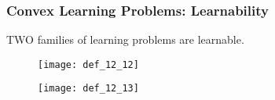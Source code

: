 \begin{frame}
\frametitle{Convex Learning Problems: Learnability}
TWO families of learning problems are learnable.

\begin{figure}
    \centering
    \texttt{[image: def\_12\_12]}
\end{figure}

\begin{figure}
    \centering
    \texttt{[image: def\_12\_13]}
\end{figure}

\end{frame}


